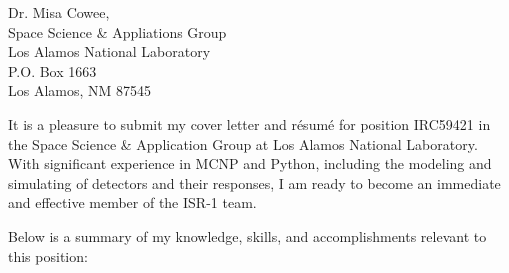 
\begin{center}
\begin{minipage}{\textwidth}

  \normalsize

  \vspace{4mm} 


  Dr. Misa Cowee, \\

  Space Science \& Appliations Group \\
  Los Alamos National Laboratory \\
  P.O. Box 1663 \\
  Los Alamos, NM 87545 \\
  
  \vspace{2mm} 

  It is a pleasure to submit my cover letter and r\'{e}sum\'{e} for position IRC59421 in the Space Science \& Application Group at Los Alamos National Laboratory.
  With significant experience in \textsc{MCNP} and Python, including the modeling and simulating of detectors and their responses, I am ready to become an immediate and effective member of the ISR-1 team.
  
  \vspace{2mm}
  Below is a summary of my knowledge, skills, and accomplishments relevant to this position: \vspace{2mm}




\end{minipage}
\end{center}
